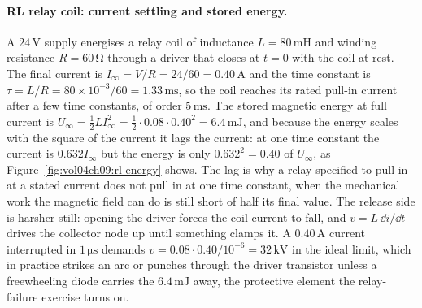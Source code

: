 \paragraph{RL relay coil: current settling and stored energy.}
A $24\,\si{\volt}$ supply energises a relay coil of inductance $L =
80\,\si{\milli\henry}$ and winding resistance $R = 60\,\si{\ohm}$ through a
driver that closes at $t = 0$ with the coil at rest. The final current is
$I_\infty = V/R = 24/60 = 0.40\,\si{\ampere}$ and the time constant is
$\tau = L/R = 80\times 10^{-3}/60 = 1.33\,\si{\milli\second}$, so the coil
reaches its rated pull-in current after a few time constants, of order
$5\,\si{\milli\second}$. The stored magnetic energy at full current is
$U_\infty = \tfrac{1}{2}LI_\infty^2 = \tfrac{1}{2}\cdot 0.08\cdot 0.40^2 =
6.4\,\si{\milli\joule}$, and because the energy scales with the square of
the current it lags the current: at one time constant the current is
$0.632I_\infty$ but the energy is only $0.632^2 = 0.40$ of $U_\infty$, as
Figure~\ref{fig:vol04ch09:rl-energy} shows. The lag is why a relay
specified to pull in at a stated current does not pull in at one time
constant, when the mechanical work the magnetic field can do is still short
of half its final value. The release side is harsher still: opening the
driver forces the coil current to fall, and $v = L\,\dd i/\dd t$ drives the
collector node up until something clamps it. A $0.40\,\si{\ampere}$ current
interrupted in $1\,\si{\micro\second}$ demands $v = 0.08\cdot 0.40/10^{-6} =
32\,\si{\kilo\volt}$ in the ideal limit, which in practice strikes an arc or
punches through the driver transistor unless a freewheeling diode carries
the $6.4\,\si{\milli\joule}$ away, the protective element the relay-failure
exercise turns on.



